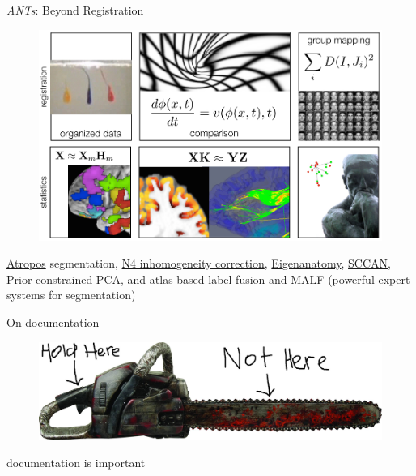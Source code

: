\documentclass[ignorenonframetext,]{beamer}
\begin{document}
\begin{frame}{\emph{ANTs}: Beyond Registration}

\begin{figure}[htbp]
\centering
\includegraphics{./figures/antscapabilities.jpg}
\caption{}
\end{figure}

\href{http://www.ncbi.nlm.nih.gov/pubmed/?term=atropos+tustison}{Atropos}
segmentation,
\href{http://www.ncbi.nlm.nih.gov/pubmed/?term=N4+tustison}{N4
inhomogeneity correction},
\href{http://www.ncbi.nlm.nih.gov/pubmed/?term=eigenanatomy+avants}{Eigenanatomy},
\href{http://www.ncbi.nlm.nih.gov/pubmed/?term=sparse+canonical+avants}{SCCAN},
\href{http://www.ncbi.nlm.nih.gov/pubmed/24852460}{Prior-constrained
PCA}, and
\href{http://www.ncbi.nlm.nih.gov/pmc/articles/PMC4009425/}{atlas-based
label fusion} and
\href{http://www.ncbi.nlm.nih.gov/pubmed/21237273}{MALF} (powerful
expert systems for segmentation)

\end{frame}

\begin{frame}{On documentation}

\begin{figure}[htbp]
\centering
\includegraphics{figures/Chainsaw.jpg}
\caption{}
\end{figure}

documentation is important

\end{frame}
\end{document}
